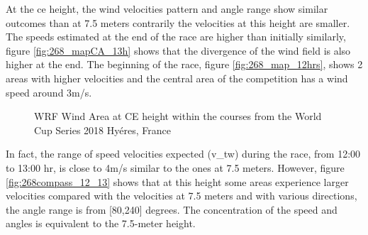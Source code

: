 At the \acrshort{ce} height, the wind velocities pattern and angle range show similar outcomes than at 7.5 meters contrarily the velocities at this height are smaller. The speeds estimated at the end of the race are higher than initially similarly, figure \ref{fig:268_mapCA_13h} shows that the divergence of the wind field is also higher at the end. The beginning of the race, figure \ref{fig:268_map_12hrs}, shows 2 areas with higher velocities and the central area of the competition has a wind speed around 3m/s. \par 
\begin{figure} [hbt!]
  \centering
  \hfill
    \hfill
  \caption{WRF Wind Area at CE height within the courses from the World Cup Series 2018 Hyéres, France} %
\label{fig:268_WSWD12_13hr}
\end{figure}
In fact, the range of speed velocities expected (\acrshort{v_tw}) during the race, from 12:00 to 13:00 hr, is close to 4m/s similar to the ones at 7.5 meters. However, figure \ref{fig:268compass_12_13} shows that at this height some areas experience larger velocities compared with the velocities at 7.5 meters and with various directions, the angle range is from [80,240] degrees. The concentration of the speed and angles is equivalent to the 7.5-meter height. 

